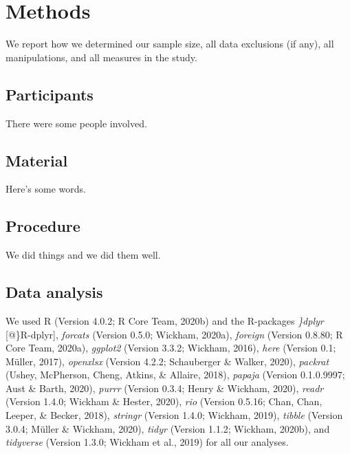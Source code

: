 \documentclass[
  english,
  man]{apa6}
\begin{document}
\hypertarget{methods}{%
\section{Methods}\label{methods}}

We report how we determined our sample size, all data exclusions (if any), all manipulations, and all measures in the study.

\hypertarget{participants}{%
\subsection{Participants}\label{participants}}

There were some people involved.

\hypertarget{material}{%
\subsection{Material}\label{material}}

Here's some words.

\hypertarget{procedure}{%
\subsection{Procedure}\label{procedure}}

We did things and we did them well.

\hypertarget{data-analysis}{%
\subsection{Data analysis}\label{data-analysis}}

We used R (Version 4.0.2; R Core Team, 2020b) and the R-packages \emph{\}dplyr} {[}@\}R-dplyr{]}, \emph{forcats} (Version 0.5.0; Wickham, 2020a), \emph{foreign} (Version 0.8.80; R Core Team, 2020a), \emph{ggplot2} (Version 3.3.2; Wickham, 2016), \emph{here} (Version 0.1; Müller, 2017), \emph{openxlsx} (Version 4.2.2; Schauberger \& Walker, 2020), \emph{packrat} (Ushey, McPherson, Cheng, Atkins, \& Allaire, 2018), \emph{papaja} (Version 0.1.0.9997; Aust \& Barth, 2020), \emph{purrr} (Version 0.3.4; Henry \& Wickham, 2020), \emph{readr} (Version 1.4.0; Wickham \& Hester, 2020), \emph{rio} (Version 0.5.16; Chan, Chan, Leeper, \& Becker, 2018), \emph{stringr} (Version 1.4.0; Wickham, 2019), \emph{tibble} (Version 3.0.4; Müller \& Wickham, 2020), \emph{tidyr} (Version 1.1.2; Wickham, 2020b), and \emph{tidyverse} (Version 1.3.0; Wickham et al., 2019) for all our analyses.
\end{document}

